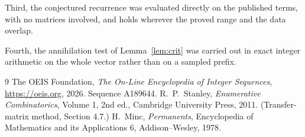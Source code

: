 \documentclass[11pt,a4paper]{article}
\theoremstyle{plain}
\theoremstyle{definition}
\begin{document}
Third, the conjectured recurrence was evaluated directly on the published terms, with no
matrices involved, and holds wherever the proved range and the data overlap.

Fourth, the annihilation test of Lemma~\ref{lem:crit} was carried out in exact integer
arithmetic on the whole vector rather than on a sampled prefix.

\begin{thebibliography}{9}
 The OEIS Foundation, \emph{The On-Line Encyclopedia of Integer
Sequences}, \url{https://oeis.org}, 2026. Sequence A189644.
 R.~P.~Stanley, \emph{Enumerative Combinatorics}, Volume 1, 2nd ed.,
Cambridge University Press, 2011. (Transfer-matrix method, Section 4.7.)
 H.~Minc, \emph{Permanents}, Encyclopedia of Mathematics and its
Applications 6, Addison--Wesley, 1978.
\end{thebibliography}
\end{document}
